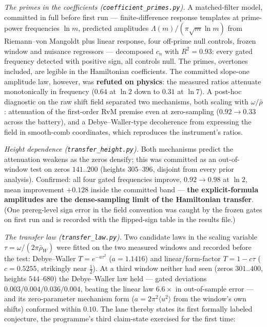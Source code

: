 \documentclass[11pt]{article}
\theoremstyle{remark}
\begin{document}
\emph{The primes in the coefficients (\texttt{coefficient\_primes.py}).} A matched-filter model,
committed in full before first run --- finite-difference response templates at prime-power
frequencies $\ln m$, predicted amplitudes $\Lambda(m)/(\pi\sqrt m \ln m)$ from Riemann--von Mangoldt
plus linear response, four off-prime null controls, frozen window and nuisance regressors ---
decomposed $c_n$ with $R^2 = 0.93$: every gated frequency detected with positive sign, all controls
null. The primes, overtones included, are legible in the Hamiltonian coefficients. The committed
slope-one amplitude law, however, was \textbf{refuted on physics}: the measured ratios attenuate
monotonically in frequency ($0.64$ at $\ln 2$ down to $0.31$ at $\ln 7$). A post-hoc diagnostic on
the raw shift field separated two mechanisms, both scaling with $\omega/\bar\rho$: attenuation of
the first-order RvM premise even at zero-sampling ($0.92 \to 0.33$ across the battery), and a
Debye--Waller-type decoherence from expressing the field in smooth-comb coordinates, which
reproduces the instrument's ratios.

\emph{Height dependence (\texttt{transfer\_height.py}).} Both mechanisms predict the attenuation
weakens as the zeros densify; this was committed as an out-of-window test on zeros $141..200$
(heights $305$--$396$, disjoint from every prior analysis). Confirmed: all four gated frequencies
improve, $0.92 \to 0.98$ at $\ln 2$, mean improvement $+0.128$ inside the committed band ---
\textbf{the explicit-formula amplitudes are the dense-sampling limit of the Hamiltonian transfer}.
(One prereg-level sign error in the field convention was caught by the frozen gates on first run
and is recorded with the flipped-sign table in the results file.)

\emph{The transfer law (\texttt{transfer\_law.py}).} Two candidate laws in the scaling variable
$\tau = \omega/(2\pi\bar\rho_W)$ were fitted on the two measured windows and recorded before the
test: Debye--Waller $T = e^{-a\tau^2}$ ($a = 1.1416$) and linear/form-factor $T = 1 - c\tau$
($c = 0.5255$, strikingly near $\tfrac12$). At a third window neither had seen (zeros $301..400$,
heights $544$--$680$) the Debye--Waller law held --- gated deviations $0.003/0.004/0.036/0.004$,
beating the linear law $6.6\times$ in out-of-sample error --- and its zero-parameter mechanism form
($a = 2\pi^2\langle u^2\rangle$ from the window's own shifts) conformed within $0.10$. The lane
thereby states its first formally labeled conjecture, the programme's third claim-state exercised
for the first time:
\end{document}
